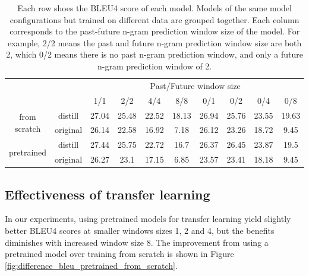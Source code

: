 \begin{table}[]
\begin{tabular}{cc|cccc|cccc|}
\cline{3-10}
\multicolumn{1}{l}{}                                & \multicolumn{1}{l|}{} & \multicolumn{8}{c|}{Past/Future window size}                  \\ \cline{3-10} 
                                                    &                       & 1/1   & 2/2   & 4/4   & 8/8   & 0/1   & 0/2   & 0/4   & 0/8   \\ \hline
\multicolumn{1}{|c|}{\multirow{2}{*}{from scratch}} & distill               & 27.04 & 25.48 & 22.52 & 18.13 & 26.94 & 25.76 & 23.55 & 19.63 \\
\multicolumn{1}{|c|}{}                              & original              & 26.14 & 22.58 & 16.92 & 7.18  & 26.12 & 23.26 & 18.72 & 9.45  \\ \hline
\multicolumn{1}{|c|}{\multirow{2}{*}{pretrained}}   & distill               & 27.44 & 25.75 & 22.72 & 16.7  & 26.37 & 26.45 & 23.87 & 19.5  \\
\multicolumn{1}{|c|}{}                              & original              & 26.27 & 23.1  & 17.15 & 6.85  & 23.57 & 23.41 & 18.18 & 9.45  \\ \hline
\end{tabular}
\caption{Each row shoes the BLEU4 score of each model. Models of the same model configurations but trained on different data are grouped together. Each column corresponds to the past-future n-gram prediction window size of the model. For example, 2/2 means the past and future n-gram prediction window size are both 2, which 0/2 means there is no past n-gram prediction window, and only a future n-gram prediction window of 2.}
\label{tab:4.5_distill_vs_original_results}
\end{table}


\subsection{Effectiveness of transfer learning}
In our experiments, using pretrained models for transfer learning yield slightly better BLEU4 scores at smaller windows sizes 1, 2 and 4, but the benefits diminishes with increased window size 8. The improvement from using a pretrained model over training from scratch is shown in Figure \ref{fig:difference_bleu_pretrained_from_scratch}.

